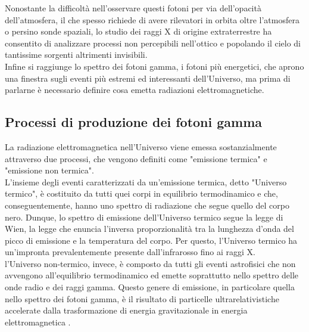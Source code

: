 \documentclass[10pt]{article}
\begin{document}
Nonostante la difficoltà nell'osservare questi fotoni per via dell'opacità dell'atmosfera, il che spesso richiede di avere rilevatori in orbita oltre l'atmosfera o persino sonde spaziali, lo studio dei raggi X di origine extraterrestre ha consentito di analizzare processi non percepibili nell'ottico e popolando il cielo di tantissime sorgenti altrimenti invisibili.
\\

Infine si raggiunge lo spettro dei fotoni gamma, i fotoni più energetici, che aprono una finestra sugli eventi più estremi ed interessanti dell'Universo, ma prima di parlarne è necessario definire cosa emetta radiazioni elettromagnetiche.
\subsection{Processi di produzione dei fotoni gamma}
La radiazione elettromagnetica nell'Universo viene emessa sostanzialmente attraverso due processi, che vengono definiti come "emissione termica" e "emissione non termica".
\\
L'insieme degli eventi caratterizzati da un'emissione termica, detto "Universo termico", è costituito da tutti quei corpi in equilibrio termodinamico e che, conseguentemente, hanno uno spettro di radiazione che segue quello del corpo nero.
Dunque, lo spettro di emissione dell'Universo termico segue la legge di Wien, la legge che enuncia l'inversa proporzionalità tra la lunghezza d'onda del picco di emissione e la temperatura del corpo. Per questo, l'Universo termico ha un'impronta prevalentemente presente dall'infrarosso fino ai raggi X.
\\

l'Universo non-termico, invece, è composto da tutti gli eventi astrofisici che non avvengono all'equilibrio termodinamico ed emette soprattutto nello spettro delle onde radio e dei raggi gamma. Questo genere di emissione, in particolare quella nello spettro dei fotoni gamma, è il risultato di particelle ultrarelativistiche accelerate dalla trasformazione di energia gravitazionale in energia elettromagnetica \cite{VHEGA}.
\\
\end{document}
